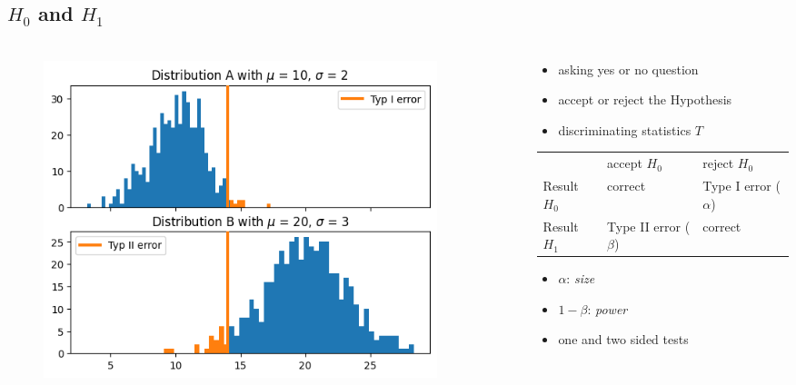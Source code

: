 \subsection{$H_0$ and $H_1$}
\begin{frame}
  \frametitle{\insertsectionhead}
\framesubtitle{\insertsubsectionhead}
\begin{columns}
  \begin{column}{0.5\textwidth}
  \centering
  \begin{figure}
      \centering
      \includegraphics[width=0.9\textwidth]{figs/hypothesis.png}
  \end{figure}
  \end{column}
  \begin{column}{0.5\textwidth}
  \centering
  \begin{itemize}
    \item asking yes or no question
    \item accept or reject the Hypothesis
    \item discriminating statistics $T$
  \end{itemize}
  \begin{table}
    \centering 
    \begin{tabular}{lll}
                 & accept $H_0$ & reject $H_0$ \\
    Result $H_0$ & correct      &Type I error ($\alpha$)  \\
    Result $H_1$ & Type II error ($\beta$) & correct  
    \end{tabular}
    \end{table}
    \begin{itemize}
      \item $\alpha$: \textit{size}
      \item $1-\beta$: \textit{power}
      \item one and two sided tests
    \end{itemize}
  \end{column}
  \end{columns}
\end{frame}
